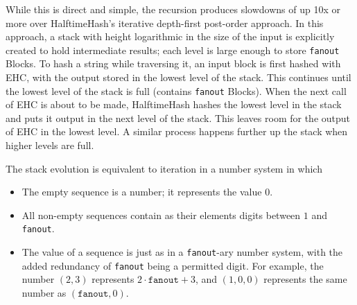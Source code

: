 \documentclass[acmsmall, nonacm]{acmart}
\begin{document}
While this is direct and simple, the recursion produces slowdowns of up 10x or more over HalftimeHash's iterative depth-first post-order approach.
In this approach, a stack with height logarithmic in the size of the input is explicitly created to hold intermediate results; each level is large enough to store \texttt{fanout} Blocks.
To hash a string while traversing it, an input block is first hashed with EHC, with the output stored in the lowest level of the stack.
This continues until the lowest level of the stack is full (contains \texttt{fanout} Blocks).
When the next call of EHC is about to be made, HalftimeHash hashes the lowest level in the stack and puts it output in the next level of the stack.
This leaves room for the output of EHC in the lowest level.
A similar process happens further up the stack when higher levels are full.

The stack evolution is equivalent to iteration in a number system in which

\begin{itemize}
\item The empty sequence is a number; it represents the value $0$.
\item All non-empty sequences contain as their elements digits between $1$ and \texttt{fanout}.
\item The value of a sequence is just as in a \texttt{fanout}-ary number system, with the added redundancy of \texttt{fanout} being a permitted digit.
  For example, the number $(2,3)$ represents $2\cdot\texttt{fanout} + 3$, and $(1,0,0)$ represents the same number as $(\texttt{fanout},0)$.
\end{itemize}


\end{document}
